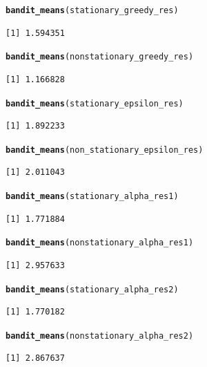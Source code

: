 \documentclass[10pt, a4paper, english]{article}\usepackage[]{graphicx}\usepackage[dvipsnames]{xcolor}
\makeatletter
\newcommand{\hlstd}[1]{\textcolor[rgb]{0.345,0.345,0.345}{#1}}%
\newcommand{\hlkwd}[1]{\textcolor[rgb]{0.737,0.353,0.396}{\textbf{#1}}}%
\newenvironment{kframe}{%
 \def\at@end@of@kframe{}%
 \ifinner\ifhmode%
  \def\at@end@of@kframe{\end{minipage}}%
  \begin{minipage}{\columnwidth}%
 \fi\fi%
 \def\FrameCommand##1{\hskip\@totalleftmargin \hskip-\fboxsep
 \colorbox{shadecolor}{##1}\hskip-\fboxsep
     \hskip-\linewidth \hskip-\@totalleftmargin \hskip\columnwidth}%
 \MakeFramed {\advance\hsize-\width
   \@totalleftmargin\z@ \linewidth\hsize
   \@setminipage}}%
 {\par\unskip\endMakeFramed%
 \at@end@of@kframe}
\newenvironment{knitrout}{}{} %
\makeatother
\begin{document}
\begin{knitrout}
\begin{kframe}
\begin{alltt}
\hlkwd{bandit_means}\hlstd{(stationary_greedy_res)}
\end{alltt}
\begin{verbatim}
[1] 1.594351
\end{verbatim}
\begin{alltt}
\hlkwd{bandit_means}\hlstd{(nonstationary_greedy_res)}
\end{alltt}
\begin{verbatim}
[1] 1.166828
\end{verbatim}
\begin{alltt}
\hlkwd{bandit_means}\hlstd{(stationary_epsilon_res)}
\end{alltt}
\begin{verbatim}
[1] 1.892233
\end{verbatim}
\begin{alltt}
\hlkwd{bandit_means}\hlstd{(non_stationary_epsilon_res)}
\end{alltt}
\begin{verbatim}
[1] 2.011043
\end{verbatim}
\begin{alltt}
\hlkwd{bandit_means}\hlstd{(stationary_alpha_res1)}
\end{alltt}
\begin{verbatim}
[1] 1.771884
\end{verbatim}
\begin{alltt}
\hlkwd{bandit_means}\hlstd{(nonstationary_alpha_res1)}
\end{alltt}
\begin{verbatim}
[1] 2.957633
\end{verbatim}
\begin{alltt}
\hlkwd{bandit_means}\hlstd{(stationary_alpha_res2)}
\end{alltt}
\begin{verbatim}
[1] 1.770182
\end{verbatim}
\begin{alltt}
\hlkwd{bandit_means}\hlstd{(nonstationary_alpha_res2)}
\end{alltt}
\begin{verbatim}
[1] 2.867637
\end{verbatim}
\end{kframe}
\end{knitrout}
\end{document}
